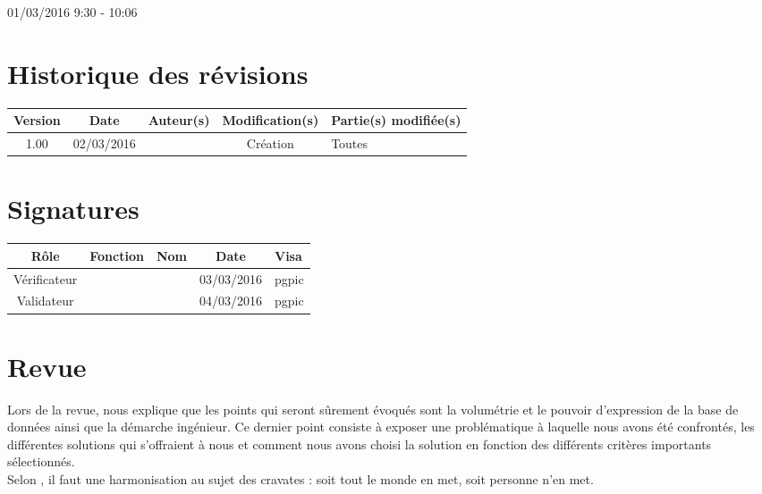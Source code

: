\documentclass [a4paper] {article}
\begin{document}
\rhead{}

01/03/2016
\hfill   
\hfill 	9:30 - 10:06 				%



\section*{Historique des révisions}
\begin{center}
			\begin{tabular}{| c | c | c | c | p{4cm} |}
				\hline
				\rowcolor{Gray}
				Version & Date & Auteur(s) & Modification(s) & Partie(s) modifiée(s)		 \\
				\hline
				1.00 & 02/03/2016 & \Pierre & Création & Toutes \\
		\hline		
			\end{tabular}
		\end{center}

\section*{Signatures}

		\begin{center}
			\begin{tabular}{| c | c | c | c | p{4cm} |}
				\hline
				\rowcolor{Gray}
				Rôle & Fonction & Nom & Date & Visa		 \\
				\hline
				Vérificateur & \RQA & \Kafui & 03/03/2016 & pgpic \\[30pt]
				\hline
				Validateur & \CP & \Sergi & 04/03/2016 & pgpic \\[30pt]	
				\hline
			\end{tabular}
		\end{center}


\section{Revue}
Lors de la revue, \nomTuteurQualite{} nous explique que les points qui seront sûrement évoqués sont la volumétrie et le pouvoir d'expression de la base de données ainsi que la démarche ingénieur. Ce dernier point consiste à exposer une problématique à laquelle nous avons été confrontés, les différentes solutions qui s'offraient à nous et comment nous avons choisi la solution en fonction des différents critères importants sélectionnés.\\
Selon \nomTuteurQualite{}, il faut une harmonisation au sujet des cravates : soit tout le monde en met, soit personne n'en met.
\end{document}
